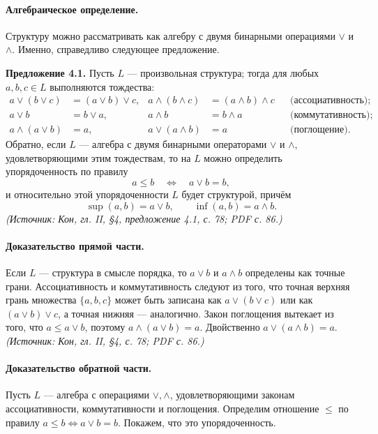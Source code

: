 \documentclass[a4paper,12pt]{article}
\begin{document}
\paragraph{Алгебраическое определение.}
Структуру можно рассматривать как алгебру с двумя бинарными операциями \(\vee\) и \(\wedge\). Именно, справедливо следующее предложение.

\textbf{Предложение 4.1.} Пусть \(L\) — произвольная структура; тогда для любых \(a,b,c\in L\) выполняются тождества:
\[
\begin{aligned}
a\vee(b\vee c)&=(a\vee b)\vee c, &
a\wedge(b\wedge c)&=(a\wedge b)\wedge c &&\text{(ассоциативность)};\\
a\vee b&=b\vee a, &
a\wedge b&=b\wedge a &&\text{(коммутативность)};\\
a\wedge(a\vee b)&=a, &
a\vee(a\wedge b)&=a &&\text{(поглощение)}.
\end{aligned}
\]
Обратно, если \(L\) — алгебра с двумя бинарными операторами \(\vee\) и \(\wedge\), удовлетворяющими этим тождествам, то на \(L\) можно определить упорядоченность по правилу
\[
a\le b\quad\Longleftrightarrow\quad a\vee b=b,
\]
и относительно этой упорядоченности \(L\) будет структурой, причём
\[
\sup(a,b)=a\vee b,\qquad \inf(a,b)=a\wedge b.
\]
\textit{(Источник: Кон, гл. II, §4, предложение 4.1, с. 78; PDF с. 86.)}

\paragraph{Доказательство прямой части.}
Если \(L\) — структура в смысле порядка, то \(a\vee b\) и \(a\wedge b\) определены как точные грани. Ассоциативность и коммутативность следуют из того, что точная верхняя грань множества \(\{a,b,c\}\) может быть записана как \(a\vee(b\vee c)\) или как \((a\vee b)\vee c\), а точная нижняя — аналогично. Закон поглощения вытекает из того, что \(a\le a\vee b\), поэтому \(a\wedge(a\vee b)=a\). Двойственно \(a\vee(a\wedge b)=a\).
\textit{(Источник: Кон, гл. II, §4, с. 78; PDF с. 86.)}

\paragraph{Доказательство обратной части.}
Пусть \(L\) — алгебра с операциями \(\vee,\wedge\), удовлетворяющими законам ассоциативности, коммутативности и поглощения. Определим отношение \(\le\) по правилу \(a\le b\Leftrightarrow a\vee b=b\). Покажем, что это упорядоченность.
\end{document}
